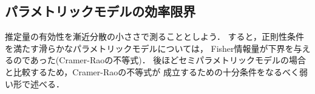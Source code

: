 \documentclass[uplatex, dvipdfmx]{jsarticle}
\begin{document}
\subsection{パラメトリックモデルの効率限界}

\begin{tcolorbox}[colframe=ForestGreen, colback=ForestGreen!10!white,breakable,colbacktitle=ForestGreen!40!white,coltitle=black,fonttitle=\bfseries\sffamily,
title=]
    推定量の有効性を漸近分散の小ささで測ることとしよう．
    すると，正則性条件を満たす滑らかなパラメトリックモデルについては，
    Fisher情報量が下界を与えるのであった(Cramer-Raoの不等式)．
    後ほどセミパラメトリックモデルの場合と比較するため，Cramer-Raoの不等式が
    成立するための十分条件をなるべく弱い形で述べる．
\end{tcolorbox}
\end{document}
